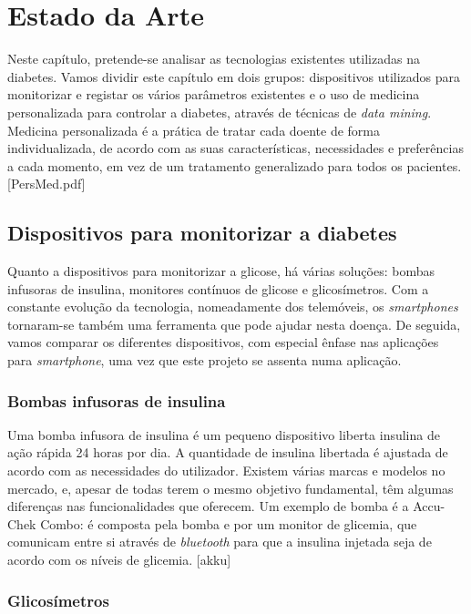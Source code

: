 \chapter{Estado da Arte}\label{chap:stat}

Neste capítulo, pretende-se analisar as tecnologias existentes utilizadas na diabetes. Vamos dividir este capítulo em dois grupos: dispositivos utilizados para monitorizar e registar os vários parâmetros existentes e o uso de medicina personalizada para controlar a diabetes, através de técnicas de \textit{data mining}. Medicina personalizada é a prática de tratar cada doente de forma individualizada, de acordo com as suas características, necessidades e preferências a cada momento, em vez de um tratamento generalizado para todos os pacientes.  [PersMed.pdf]


\section{Dispositivos para monitorizar a diabetes}

Quanto a dispositivos para monitorizar a glicose, há várias soluções: bombas infusoras de insulina, monitores contínuos de glicose e glicosímetros. Com a constante evolução da tecnologia, nomeadamente dos telemóveis, os \textit{smartphones} tornaram-se também uma ferramenta que pode ajudar nesta doença. De seguida, vamos comparar os diferentes dispositivos, com especial ênfase nas aplicações para \textit{smartphone}, uma vez que este projeto se assenta numa aplicação. 

\subsection{Bombas infusoras de insulina}

Uma bomba infusora de insulina é um pequeno dispositivo liberta insulina de ação rápida 24 horas por dia. A quantidade de insulina libertada é ajustada de acordo com as necessidades do utilizador. Existem várias marcas e modelos no mercado, e, apesar de todas terem o mesmo objetivo fundamental, têm algumas diferenças nas funcionalidades que oferecem. Um exemplo de bomba é a Accu-Chek Combo: é composta pela bomba e por um monitor de glicemia, que comunicam entre si através de \textit{bluetooth} para que a insulina injetada seja de acordo com os níveis de glicemia. [akku]

\subsection{Glicosímetros}

